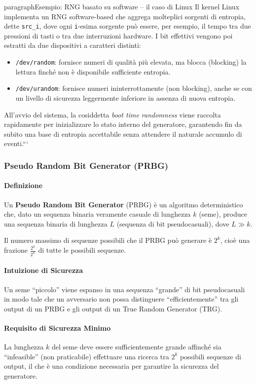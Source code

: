 \documentclass{report}
\begin{document}
paragraph{Esempio: RNG basato su software – il caso di Linux}
Il kernel Linux implementa un RNG software-based che aggrega molteplici sorgenti di entropia, dette \texttt{src\_i}, dove ogni \texttt{i}-esima sorgente può essere, per esempio, il tempo tra due pressioni di tasti o tra due interruzioni hardware. I bit effettivi vengono poi estratti da due dispositivi a caratteri distinti:
\begin{itemize}
    \item \texttt{/dev/random}: fornisce numeri di qualità più elevata, ma blocca (blocking) la lettura finché non è disponibile sufficiente entropia.
    \item \texttt{/dev/urandom}: fornisce numeri ininterrottamente (non blocking), anche se con un livello di sicurezza leggermente inferiore in assenza di nuova entropia.
\end{itemize}
All’avvio del sistema, la cosiddetta \emph{boot time randomness} viene raccolta rapidamente per inizializzare lo stato interno del generatore, garantendo fin da subito una base di entropia accettabile senza attendere il naturale accumulo di eventi.```

\subsubsection{Pseudo Random Bit Generator (PRBG)}

\paragraph{Definizione}
Un \textbf{Pseudo Random Bit Generator} (PRBG) è un algoritmo deterministico che, dato un sequenza binaria veramente casuale di lunghezza \(k\) (seme), produce una sequenza binaria di lunghezza \(L\) (sequenza di bit pseudocasuali), dove \(L \gg k\).

Il numero massimo di sequenze possibili che il PRBG può generare è \(2^k\), cioè una frazione \( \frac{2^k}{2^L} \) di tutte le possibili sequenze.

\paragraph{Intuizione di Sicurezza}
Un seme “piccolo” viene espanso in una sequenza “grande” di bit pseudocasuali in modo tale che un avversario non possa distinguere “efficientemente” tra gli output di un PRBG e gli output di un True Random Generator (TRG).

\paragraph{Requisito di Sicurezza Minimo}
La lunghezza \(k\) del seme deve essere sufficientemente grande affinché sia “infeasible” (non praticabile) effettuare una ricerca tra \(2^k\) possibili sequenze di output, il che è una condizione necessaria per garantire la sicurezza del generatore.
\end{document}
